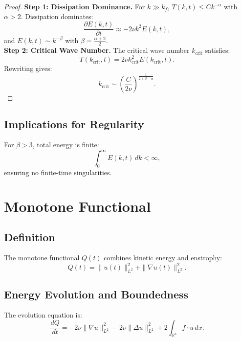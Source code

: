 \documentclass[12pt]{article}
\theoremstyle{definition}
\theoremstyle{remark}
\begin{document}
\begin{proof}
\textbf{Step 1: Dissipation Dominance.} For $k \gg k_f$, $T(k, t) \leq Ck^{-\alpha}$ with $\alpha > 2$. Dissipation dominates:
\begin{equation}
\frac{\partial E(k, t)}{\partial t} \approx -2\nu k^2 E(k, t),
\end{equation}
and $E(k, t) \sim k^{-\beta}$ with $\beta = \frac{\alpha + 2}{2}$.\\
\textbf{Step 2: Critical Wave Number.} The critical wave number $k_{\text{crit}}$ satisfies:
\begin{equation}
T(k_{\text{crit}}, t) = 2\nu k_{\text{crit}}^2 E(k_{\text{crit}}, t).
\end{equation}
Rewriting gives:
\begin{equation}
k_{\text{crit}} \sim \left( \frac{C}{2\nu} \right)^{\frac{1}{2+\beta-\alpha}}.
\end{equation}
\end{proof}

\subsection{Implications for Regularity}
For $\beta > 3$, total energy is finite:
\begin{equation}
\int_0^\infty E(k, t) \, dk < \infty,
\end{equation}
ensuring no finite-time singularities.

\section{Monotone Functional}

\subsection{Definition}
The monotone functional $Q(t)$ combines kinetic energy and enstrophy:
\begin{equation}
Q(t) = \|u(t)\|_{L^2}^2 + \|\nabla u(t)\|_{L^2}^2.
\end{equation}

\subsection{Energy Evolution and Boundedness}
The evolution equation is:
\begin{equation}
\frac{dQ}{dt} = -2\nu \|\nabla u\|_{L^2}^2 - 2\nu \|\Delta u\|_{L^2}^2 + 2\int_{\mathbb{R}^3} f \cdot u \, dx.
\end{equation}
\end{document}
